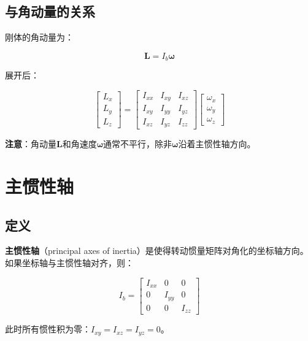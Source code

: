 \documentclass[12pt,a4paper]{article}
\begin{document}
\subsection{与角动量的关系}

刚体的角动量为：

\begin{equation}
\bm{L} = I_b \bm{\omega}
\label{eq:angular_momentum}
\end{equation}

展开后：

\begin{equation}
\begin{bmatrix}
L_x \\
L_y \\
L_z
\end{bmatrix} = \begin{bmatrix}
I_{xx} & I_{xy} & I_{xz} \\
I_{xy} & I_{yy} & I_{yz} \\
I_{xz} & I_{yz} & I_{zz}
\end{bmatrix} \begin{bmatrix}
\omega_x \\
\omega_y \\
\omega_z
\end{bmatrix}
\end{equation}

\textbf{注意}：角动量$\bm{L}$和角速度$\bm{\omega}$通常不平行，除非$\bm{\omega}$沿着主惯性轴方向。

\section{主惯性轴}

\subsection{定义}

\textbf{主惯性轴}（principal axes of inertia）是使得转动惯量矩阵对角化的坐标轴方向。如果坐标轴与主惯性轴对齐，则：

\begin{equation}
I_b = \begin{bmatrix}
I_{xx} & 0 & 0 \\
0 & I_{yy} & 0 \\
0 & 0 & I_{zz}
\end{bmatrix}
\label{eq:diagonal_inertia}
\end{equation}

此时所有惯性积为零：$I_{xy} = I_{xz} = I_{yz} = 0$。
\end{document}
